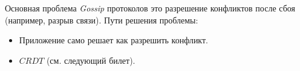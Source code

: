 \begin{remark}
    Основная проблема \textit{Gossip} протоколов это разрешение конфликтов после сбоя (например, разрыв связи).
    Пути решения проблемы:
    \begin{itemize}
        \item Приложение само решает как разрешить конфликт.
        \item $CRDT$ (см. следующий билет).
    \end{itemize}
\end{remark}
